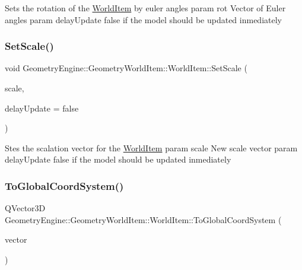 Sets the rotation of the \mbox{\hyperlink{class_geometry_engine_1_1_geometry_world_item_1_1_world_item}{World\+Item}} by euler angles param rot Vector of Euler angles param delay\+Update false if the model should be updated inmediately \mbox{\label{class_geometry_engine_1_1_geometry_world_item_1_1_world_item_a0c1d06ab783adb8fd8b574b428933aed}} 
\subsubsection{\texorpdfstring{SetScale()}{SetScale()}}
{\footnotesize\ttfamily void Geometry\+Engine\+::\+Geometry\+World\+Item\+::\+World\+Item\+::\+Set\+Scale (\begin{DoxyParamCaption}\item[{const Q\+Vector3D \&}]{scale,  }\item[{bool}]{delay\+Update = {\ttfamily false} }\end{DoxyParamCaption})}

Stes the scalation vector for the \mbox{\hyperlink{class_geometry_engine_1_1_geometry_world_item_1_1_world_item}{World\+Item}} param scale New scale vector param delay\+Update false if the model should be updated inmediately \mbox{\label{class_geometry_engine_1_1_geometry_world_item_1_1_world_item_a8ec661078740d53d1912f68a5bdb84f3}} 
\subsubsection{\texorpdfstring{ToGlobalCoordSystem()}{ToGlobalCoordSystem()}}
{\footnotesize\ttfamily Q\+Vector3D Geometry\+Engine\+::\+Geometry\+World\+Item\+::\+World\+Item\+::\+To\+Global\+Coord\+System (\begin{DoxyParamCaption}\item[{const Q\+Vector3D \&}]{vector }\end{DoxyParamCaption})\hspace{0.3cm}{\ttfamily [virtual]}}

